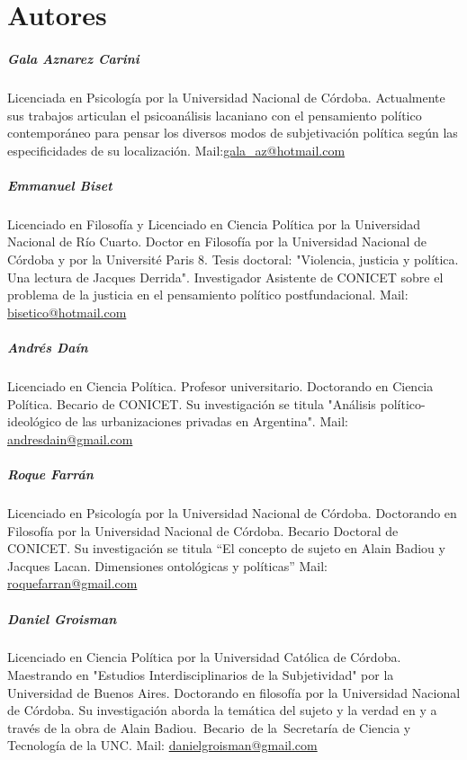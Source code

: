 \chapter{Autores}

\paragraph{Gala Aznarez Carini} Licenciada en Psicología por la Universidad Nacional de Córdoba.
Actualmente sus trabajos articulan el psicoanálisis lacaniano con el
pensamiento político contemporáneo para pensar los diversos modos de
subjetivación política según las especificidades de su localización.
Mail:\url{gala\_az@hotmail.com}

\paragraph{Emmanuel Biset} Licenciado en Filosofía y Licenciado en Ciencia Política por la
Universidad Nacional de Río Cuarto. Doctor en Filosofía por la
Universidad Nacional de Córdoba y por la Université Paris 8. Tesis
doctoral: "Violencia, justicia y política. Una lectura de Jacques
Derrida". Investigador Asistente de CONICET sobre el problema de la
justicia en el pensamiento político postfundacional. Mail: \url{bisetico@hotmail.com}

\paragraph{Andrés Daín} Licenciado en Ciencia Política. Profesor universitario. Doctorando en
Ciencia Política. Becario de CONICET. Su investigación se titula
"Análisis político-ideológico de las urbanizaciones privadas en
Argentina". Mail: \url{andresdain@gmail.com}

\paragraph{Roque Farrán} Licenciado en Psicología por la Universidad Nacional de Córdoba.
Doctorando en Filosofía por la Universidad Nacional de Córdoba. Becario
Doctoral de CONICET. Su investigación se titula \enquote{El concepto de sujeto
en Alain Badiou y Jacques Lacan. Dimensiones ontológicas y políticas} Mail: \url{roquefarran@gmail.com}

\paragraph{Daniel Groisman} Licenciado en Ciencia Política por la Universidad Católica de Córdoba.
Maestrando en "Estudios Interdisciplinarios de la Subjetividad" por la
Universidad de Buenos Aires. Doctorando en filosofía por la Universidad
Nacional de Córdoba. Su investigación aborda la temática del sujeto y la
verdad en y a través de la obra de Alain Badiou.~Becario~de
la~Secretaría de Ciencia y Tecnología de la UNC. Mail: \url{danielgroisman@gmail.com}

